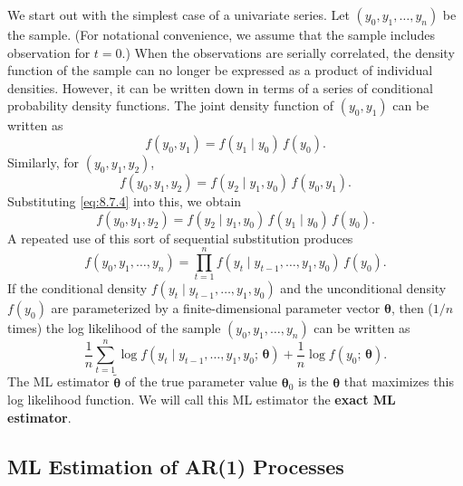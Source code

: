 We start out with the simplest case of a univariate series. Let $(y_0, y_1, \ldots, y_n)$ be the
sample. (For notational convenience, we assume that the sample includes observation for $t = 0$.) When the observations are serially correlated, the density function
of the sample can no longer be expressed as a product of individual densities. However, it can be written down in terms of a series of conditional probability density
functions. The joint density function of $(y_0, y_1)$ can be written as
\begin{equation}
  f(y_0, y_1) = f(y_1 \mid y_0)\,f(y_0).
  \label{eq:8.7.4} \tag{8.7.4}
\end{equation}
Similarly, for $(y_0, y_1, y_2)$,
\begin{equation}
  f(y_0, y_1, y_2) = f(y_2 \mid y_1, y_0)\,f(y_0, y_1).
  \label{eq:8.7.5} \tag{8.7.5}
\end{equation}
Substituting \eqref{eq:8.7.4} into this, we obtain
\begin{equation}
  f(y_0, y_1, y_2) = f(y_2 \mid y_1, y_0)\,f(y_1 \mid y_0)\,f(y_0).
  \label{eq:8.7.6} \tag{8.7.6}
\end{equation}
A repeated use of this sort of sequential substitution produces
\begin{equation}
  f(y_0, y_1, \ldots, y_n)
  = \prod_{t=1}^{n} f(y_t \mid y_{t-1}, \ldots, y_1, y_0)\,f(y_0).
  \label{eq:8.7.7} \tag{8.7.7}
\end{equation}
If the conditional density $f(y_t \mid y_{t-1}, \ldots, y_1, y_0)$ and the unconditional density
$f(y_0)$ are parameterized by a finite-dimensional parameter vector $\boldsymbol{\theta}$, then ($1/n$
times) the log likelihood of the sample $(y_0, y_1, \ldots, y_n)$ can be written as
\begin{equation}
  \frac{1}{n}\sum_{t=1}^{n}
    \log f(y_t \mid y_{t-1}, \ldots, y_1, y_0;\, \boldsymbol{\theta})
  + \frac{1}{n}\log f(y_0;\, \boldsymbol{\theta}).
  \label{eq:8.7.8} \tag{8.7.8}
\end{equation}
The ML estimator $\tilde{\boldsymbol{\theta}}$ of the true parameter value $\boldsymbol{\theta}_0$ is the $\boldsymbol{\theta}$ that maximizes this log
likelihood function. We will call this ML estimator the \textbf{exact ML estimator}.

\subsection*{ML Estimation of AR(1) Processes}

